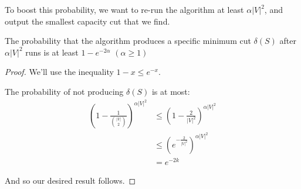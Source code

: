 To boost this probability, we want to re-run the algorithm at least $\alpha|V|^2$, and output the smallest capacity cut that we find.
\begin{corollary}{}{}
    The probability that the algorithm produces a specific minimum cut $\delta(S)$ after $\alpha|V|^2$ runs is at least $1 - e^{-2\alpha}$ $(\alpha \geq 1)$
\end{corollary}
\begin{proof}
    We'll use the inequality $1 - x \leq e^{-x}$.

    The probability of not producing $\delta(S)$ is at most:
    \begin{align*}
        \left(1 - \frac{1}{\binom{|V|}{2}}\right)^{\alpha|V|^2} &\leq \left(1 - \frac{2}{|V|^2}\right)^{\alpha|V|^2} \\
        &\leq \left(e^{-\frac{2}{|V|^2}}\right)^{\alpha|V|^2} \\
        &= e^{-2k}
    \end{align*}

    And so our desired result follows.
\end{proof}